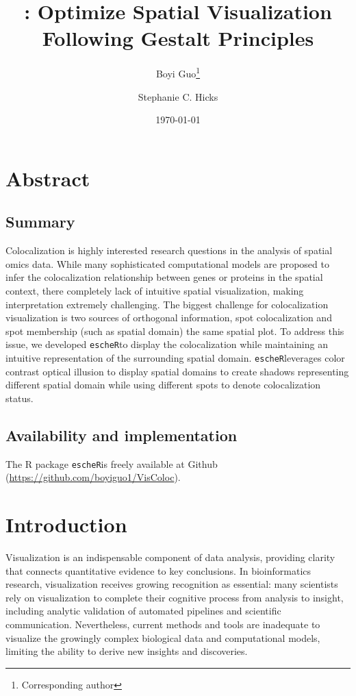 \documentclass[11pt]{article}
\title{\coloc: Optimize Spatial Visualization Following Gestalt Principles}
\author[1]{Boyi Guo\thanks{Corresponding author}}
\author[1]{Stephanie C. Hicks}
\affil[1]{Department of Biostatistics, Johns Hopkins Bloomberg School of Public Health, MD, USA}
\date{\today}
\newcommand{\fixme}[1]{{\color{red} (#1)}}
\newcommand{\coloc}{\texttt{escheR}}
\begin{document}
\maketitle

\vspace{-.6in}

\section*{Abstract}
\subsection*{Summary}
Colocalization is highly interested research questions in the analysis of spatial omics data. While many sophisticated computational models are proposed to infer the colocalization relationship between genes or proteins in the spatial context, there completely lack of intuitive spatial visualization, making interpretation extremely challenging. The biggest challenge for colocalization visualization is two sources of orthogonal information, spot colocalization and spot membership (such as spatial domain) the same spatial plot. To address this issue, we developed \coloc to display the colocalization while maintaining an intuitive representation of the surrounding spatial domain. \coloc leverages color contrast optical illusion to display spatial domains to create shadows representing different spatial domain while using different spots to denote colocalization status.  

\subsection*{Availability and implementation}
The R package \coloc is freely available at Github (\url{https://github.com/boyiguo1/VisColoc}).


\section*{Introduction}
Visualization is an indispensable component of data analysis, providing clarity that connects quantitative evidence to key conclusions. \cite{dagostinomcgowan_2022} In bioinformatics research, visualization receives growing recognition as essential: many scientists rely on visualization to complete their cognitive process from analysis to insight, including analytic validation of automated pipelines and scientific communication. \cite{odonoghue_2021} Nevertheless, current methods and tools are inadequate to visualize the growingly complex biological data and computational models, limiting the ability to derive new insights and discoveries. \cite{odonoghue_2010}  
\end{document}
